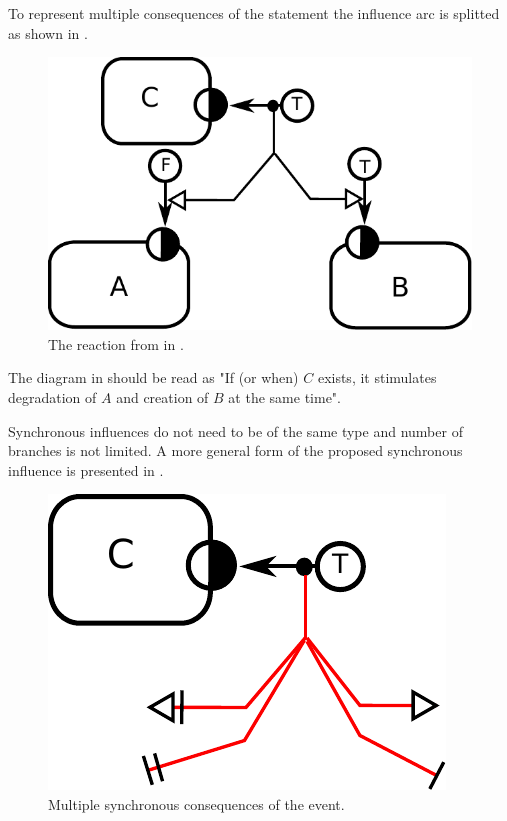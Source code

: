 To represent multiple consequences of the statement the influence arc is splitted  as shown in . 

\begin{figure}[H]
  \centering
  \includegraphics[scale = 0.75]{images/synchronous}
  \caption{The reaction from  in \ER.}
  \label{fig:synchronous}
\end{figure}

The diagram in   should be read as "If (or when) $C$ exists, it stimulates degradation of $A$ and creation of $B$ at the same time". 

Synchronous influences do not need to be of the same type and number of branches is not limited. A more general form of the proposed synchronous influence is presented in .

\begin{figure}[H]
  \centering
  \includegraphics[scale = 0.75]{images/simultaneous}
  \caption{Multiple synchronous consequences of the event.}
  \label{fig:simultaneous}
\end{figure}


